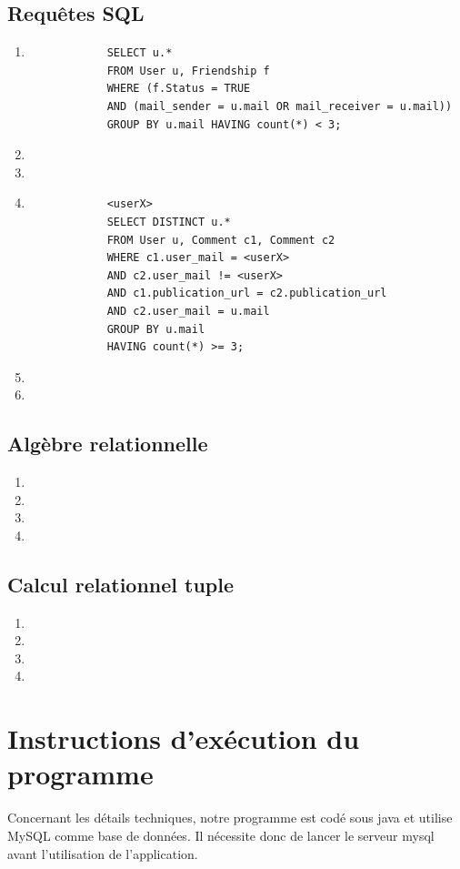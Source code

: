 \documentclass[a4paper,10pt]{article}
\begin{document}
\subsection{Requêtes SQL}

	\begin{enumerate}
	    \item 
		\begin{verbatim}
			SELECT u.*
			FROM User u, Friendship f 
			WHERE (f.Status = TRUE 
			AND (mail_sender = u.mail OR mail_receiver = u.mail))
			GROUP BY u.mail HAVING count(*) < 3;
		\end{verbatim}
		
	    \item
	    \item 
	    \item 
		\begin{verbatim}
			<userX>
			SELECT DISTINCT u.*
			FROM User u, Comment c1, Comment c2
			WHERE c1.user_mail = <userX>
			AND c2.user_mail != <userX>
			AND c1.publication_url = c2.publication_url
			AND c2.user_mail = u.mail
			GROUP BY u.mail
			HAVING count(*) >= 3;
		\end{verbatim}
	    \item 
	    \item 
	\end{enumerate}

\subsection{Algèbre relationnelle}

	\begin{enumerate}
	    \item 
	    \item
	    \item 
	    \item
	\end{enumerate}

\subsection{Calcul relationnel tuple}

	\begin{enumerate}
	    \item 
	    \item
	    \item 
	    \item
	\end{enumerate}

\section{Instructions d'exécution du programme}

Concernant les détails techniques, notre programme est codé sous java et utilise MySQL comme base de données. Il nécessite donc de lancer le serveur mysql avant l'utilisation de l'application.
\end{document}
